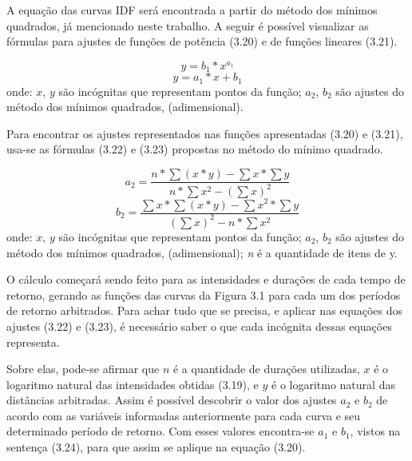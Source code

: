 A equação das curvas IDF será encontrada a partir do método dos mínimos quadrados, já mencionado neste trabalho. A seguir é possível visualizar as fórmulas para ajustes de funções de potência (3.20) e de funções lineares (3.21).\bigskip

\begin{equation}
y = b_1 * x^{a_1}
\end{equation}
\bigskip
\begin{equation}
y = a_{1} * x + b_{1}
\end{equation}
\newline
onde:
\newline
$x$, $y$ são incógnitas que representam pontos da função;
\newline
$a_2$, $b_2$ são ajustes do método dos mínimos quadrados, (adimensional).\bigskip

Para encontrar os ajustes representados nas funções apresentadas (3.20) e (3.21), usa-se as fórmulas (3.22) e (3.23) propostas no método do mínimo quadrado.\bigskip

\begin{equation}
a_2 = \frac{n * \sum{(x * y)} - \sum{x} * \sum{y}}{n * \sum{x^2} - (\sum{x})^2}
\end{equation}
\bigskip
\begin{equation}
b_2 = \frac{\sum{x} * \sum{(x * y)} - \sum{x^2} * \sum{y}}{(\sum{x})^2 - n * \sum{x^2}}
\end{equation}
\newline
onde:
\newline
$x$, $y$ são incógnitas que representam pontos da função;
\newline
$a_2$, $b_2$ são ajustes do método dos mínimos quadrados, (adimensional);
\newline
\textit{n} é a quantidade de itens de y.\bigskip

O cálculo começará sendo feito para as intensidades e durações de cada tempo de retorno, gerando as funções das curvas da Figura 3.1 para cada um dos períodos de retorno arbitrados. Para achar tudo que se precisa, e aplicar nas equações dos ajustes (3.22) e (3.23), é necessário saber o que cada incógnita dessas equações representa. 

Sobre elas, pode-se afirmar que $n$ é a quantidade de durações utilizadas, $x$ é o logaritmo natural das intensidades obtidas (3.19), e $y$ é o logaritmo natural das distâncias arbitradas. Assim é possível descobrir o valor dos ajustes $a_2$ e $b_2$ de acordo com as variáveis informadas anteriormente para cada curva e seu determinado período de retorno. Com esses valores encontra-se $a_1$ e $b_1$, vistos na sentença (3.24), para que assim se aplique na equação (3.20).\bigskip


